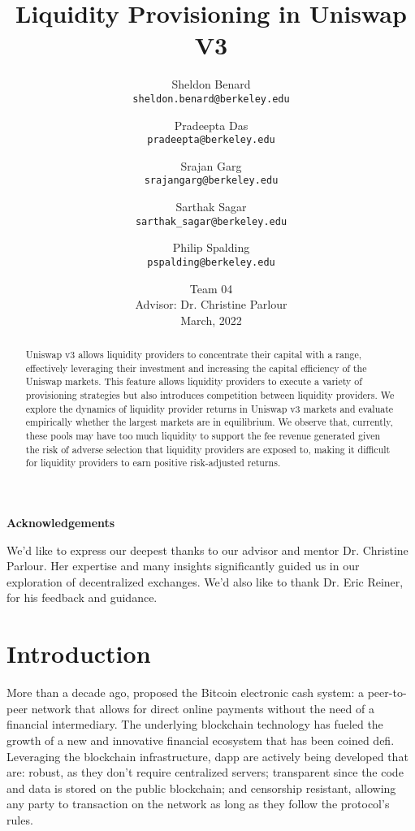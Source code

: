 \documentclass[11pt]{article}
\title{\textbf{Liquidity Provisioning in Uniswap V3}}
\author{
Sheldon Benard \\
\texttt{sheldon.benard@berkeley.edu} \and
Pradeepta Das \\
\texttt{pradeepta@berkeley.edu} \and
Srajan Garg \\
\texttt{srajangarg@berkeley.edu} \and
Sarthak Sagar \\
\texttt{sarthak\_sagar@berkeley.edu} \and
Philip Spalding \\
\texttt{pspalding@berkeley.edu}
}
\date{
\vspace{2cm}Team 04 \\
Advisor: Dr. Christine Parlour\\
\vspace{2cm}March, 2022
}
\begin{document}
\maketitle

\vspace{1cm}
\begin{abstract}
\noindent Uniswap v3 allows liquidity providers to concentrate their capital with a range, effectively leveraging their investment and increasing the capital efficiency of the Uniswap markets. This feature allows liquidity providers to execute a variety of provisioning strategies but also introduces competition between liquidity providers. We explore the dynamics of liquidity provider returns in Uniswap v3 markets and evaluate empirically whether the largest markets are in equilibrium. We observe that, currently, these pools may have too much liquidity to support the fee revenue generated given the risk of adverse selection that liquidity providers are exposed to, making it difficult for liquidity providers to earn positive risk-adjusted returns.
\end{abstract}
\thispagestyle{empty}

\clearpage
\hspace{0pt}
\vfill
\begin{center}
    \textbf{Acknowledgements}
\end{center}
We'd like to express our deepest thanks to our advisor and mentor Dr. Christine Parlour. Her expertise and many insights significantly guided us in our exploration of decentralized exchanges. We'd also like to thank Dr. Eric Reiner, for his feedback and guidance.
\vfill
\hspace{0pt}
\thispagestyle{empty}

\clearpage
\tableofcontents
\thispagestyle{empty}

\clearpage
\printglossary[type=\acronymtype,nonumberlist,nopostdot]
\thispagestyle{empty}

\clearpage
\doublespacing
{}

\section{Introduction}\label{sec:1}

More than a decade ago, \cite{Bitcoin} proposed the Bitcoin electronic cash system: a peer-to-peer network that allows for direct online payments without the need of a financial intermediary. The underlying \gls{blockchain} technology has fueled the growth of a new and innovative financial ecosystem that has been coined \gls{defi}. Leveraging the \gls{blockchain} infrastructure, \gls{dapp} are actively being developed that are: robust, as they don't require centralized servers; transparent since the code and data is stored on the public blockchain; and censorship resistant, allowing any party to transaction on the network as long as they follow the protocol's rules.
\end{document}
